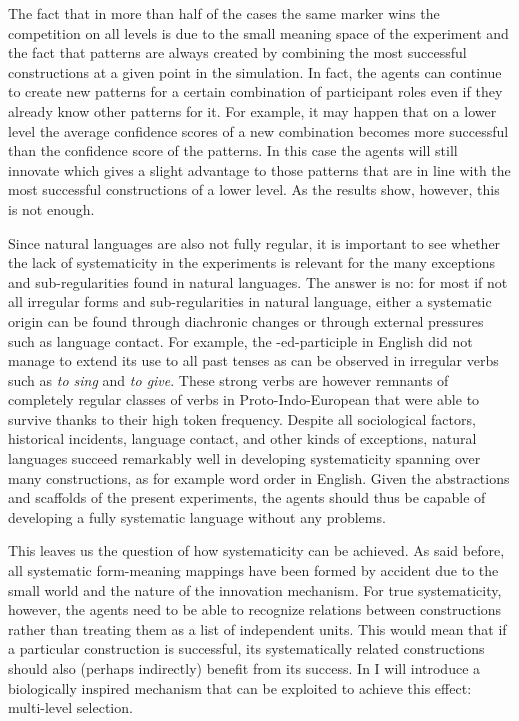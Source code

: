 The fact that in more than half of the cases the same marker wins the competition on all levels is due to the small meaning space of the experiment and the fact that patterns are always created by combining the most successful constructions at a given point in the simulation. In fact, the agents can continue to create new patterns for a certain combination of participant roles even if they already know other patterns for it. For example, it may happen that on a lower level the average confidence scores of a new combination becomes more successful than the confidence score of the patterns. In this case the agents will still innovate which gives a slight advantage to those patterns that are in line with the most successful constructions of a lower level. As the results show, however, this is not enough.

Since natural languages are also not fully regular, it is important to see whether the lack of systematicity in the experiments is relevant for the many exceptions and sub-regularities found in natural languages. The answer is no: for most if not all irregular forms and sub-regularities in natural language, either a systematic origin can be found through diachronic changes or through external pressures such as language contact. For example, the -ed-participle in English did not manage to extend its use to all past tenses as can be observed in irregular verbs such as {\em to sing} and {\em to give}. These strong verbs are however remnants of completely regular classes of verbs in Proto-Indo-European that were able to survive thanks to their high token frequency. Despite all sociological factors, historical incidents, language contact, and other kinds of exceptions, natural languages succeed remarkably well in developing systematicity spanning over many constructions, as for example word order in English. Given the abstractions and scaffolds of the present experiments, the agents should thus be capable of developing a fully systematic language without any problems.

This leaves us the question of how systematicity can be achieved. As said before, all systematic form-meaning mappings have been formed by accident due to the small world and the nature of the innovation mechanism. For true systematicity, however, the agents need to be able to recognize relations between constructions rather than treating them as a list of independent units. This would mean that if a particular construction is successful, its systematically related constructions should also (perhaps indirectly) benefit from its success. In  I will introduce a biologically inspired mechanism that can be exploited to achieve this effect: multi-level selection.

